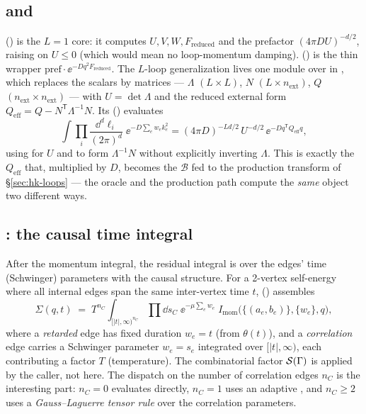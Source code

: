 \subsection{ and }

 () is the
$L=1$ core: it computes $U,V,W,F_{\text{reduced}}$ and the prefactor
$(4\pi D U)^{-d/2}$, raising on $U\le 0$ (which would mean no loop-momentum
damping).  ()
is the thin wrapper $\text{pref}\cdot\ee^{-Dq^{2}F_{\text{reduced}}}$. The
$L$-loop generalization lives one module over in ,
which replaces the scalars by matrices --- $\Lambda$ $(L\times L)$, $N$
$(L\times n_{\text{ext}})$, $Q$ $(n_{\text{ext}}\times n_{\text{ext}})$ --- with
$U=\det\Lambda$ and the reduced external form
$Q_{\text{eff}}=Q-N^{\mathsf T}\Lambda^{-1}N$. Its 
() evaluates
\[
  \int \prod_i\frac{\dd^{d}\ell_i}{(2\pi)^{d}}\;\ee^{-D\sum_e w_e k_e^{2}}
  = (4\pi D)^{-Ld/2}\,U^{-d/2}\,\ee^{-D q^{\mathsf T} Q_{\text{eff}} q},
\]
using  for $U$ and  to form
$\Lambda^{-1}N$ without explicitly inverting $\Lambda$. This is exactly the
$Q_{\text{eff}}$ that, multiplied by $D$, becomes the $\mathcal{B}$ fed to the
production transform of \S\ref{sec:hk-loops} --- the oracle and the production
path compute the \emph{same} object two different ways.

\subsection{: the causal time integral}

After the momentum integral, the residual integral is over the edges' time
(Schwinger) parameters with the causal structure. For a 2-vertex self-energy
where all internal edges span the same inter-vertex time $t$,
 () assembles
\[
  \Sigma(q,t) \;=\; T^{n_C}\int_{[|t|,\infty)^{n_C}}\!\prod\dd s_C\;
  \ee^{-\mu\sum_e w_e}\;I_{\text{mom}}\big(\{(a_e,b_e)\},\{w_e\},q\big),
\]
where a \emph{retarded} edge has fixed duration $w_e=t$ (from $\theta(t)$), and a
\emph{correlation} edge carries a Schwinger parameter $w_e=s_e$ integrated over
$[|t|,\infty)$, each contributing a factor $T$ (temperature). The combinatorial
factor $\mathcal{S}(\Gamma)$ is applied by the caller, not here. The dispatch on the
number of correlation edges $n_C$ is the interesting part: $n_C=0$ evaluates
directly, $n_C=1$ uses an adaptive , and $n_C\ge 2$
uses a \emph{Gauss--Laguerre tensor rule} over the correlation parameters.

